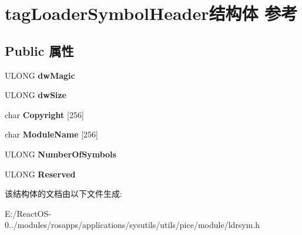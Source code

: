\hypertarget{structtag_loader_symbol_header}{}\section{tag\+Loader\+Symbol\+Header结构体 参考}
\label{structtag_loader_symbol_header}
\subsection*{Public 属性}
\begin{DoxyCompactItemize}
\item 
\mbox{\label{structtag_loader_symbol_header_a512a916f5b72e2287498641222bc2eac}} 
U\+L\+O\+NG {\bfseries dw\+Magic}
\item 
\mbox{\label{structtag_loader_symbol_header_a2991d6f9d20b0cc2d8c78125a080b3e6}} 
U\+L\+O\+NG {\bfseries dw\+Size}
\item 
\mbox{\label{structtag_loader_symbol_header_a98080920f39e84dad27ee9949b8b0980}} 
char {\bfseries Copyright} \mbox{[}256\mbox{]}
\item 
\mbox{\label{structtag_loader_symbol_header_a82fd9e21d525eea082a1a3fa5ed84eca}} 
char {\bfseries Module\+Name} \mbox{[}256\mbox{]}
\item 
\mbox{\label{structtag_loader_symbol_header_a8c53b78f718ac739b8774bd17d158f46}} 
U\+L\+O\+NG {\bfseries Number\+Of\+Symbols}
\item 
\mbox{\label{structtag_loader_symbol_header_a82060a8fdb132a89bd22d1e2704efe19}} 
U\+L\+O\+NG {\bfseries Reserved}
\end{DoxyCompactItemize}


该结构体的文档由以下文件生成\+:\begin{DoxyCompactItemize}
\item 
E\+:/\+React\+O\+S-\/0../modules/rosapps/applications/sysutils/utils/pice/module/ldrsym.\+h\end{DoxyCompactItemize}
